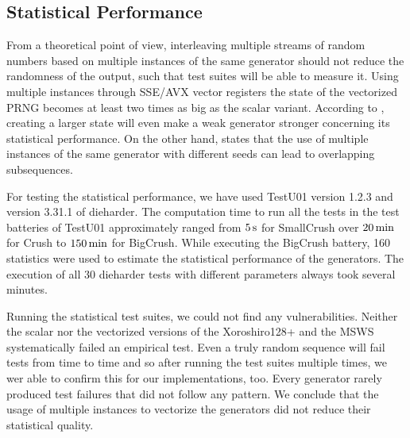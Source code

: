 \documentclass{stdlocal}
\begin{document}
  \subsection{Statistical Performance} %
  \label{sub:statistical_performance}
    From a theoretical point of view, interleaving multiple streams of random numbers based on multiple instances of the same generator should not reduce the randomness of the output, such that test suites will be able to measure it.
    Using multiple instances through SSE/AVX vector registers the state of the vectorized PRNG becomes at least two times as big as the scalar variant.
    According to \textcite{oneill-blog-toobig}, creating a larger state will even make a weak generator stronger concerning its statistical performance.
    On the other hand, \textcite{fog2015} states that the use of multiple instances of the same generator with different seeds can lead to overlapping subsequences.

    For testing the statistical performance, we have used TestU01 version 1.2.3 and version 3.31.1 of dieharder.
    The computation time to run all the tests in the test batteries of TestU01 approximately ranged from $5\, \mathrm{s}$ for SmallCrush over $20\, \mathrm{min}$ for Crush to $150\, \mathrm{min}$ for BigCrush.
    While executing the BigCrush battery, 160 statistics were used to estimate the statistical performance of the generators.
    The execution of all 30 dieharder tests with different parameters always took several minutes.

    Running the statistical test suites, we could not find any vulnerabilities.
    Neither the scalar nor the vectorized versions of the Xoroshiro128+ and the MSWS systematically failed an empirical test.
    Even a truly random sequence will fail tests from time to time \autocite[\pno~142]{kneusel2018} and so after running the test suites multiple times, we wer able to confirm this for our implementations, too.
    Every generator rarely produced test failures that did not follow any pattern.
    We conclude that the usage of multiple instances to vectorize the generators did not reduce their statistical quality.
\end{document}
